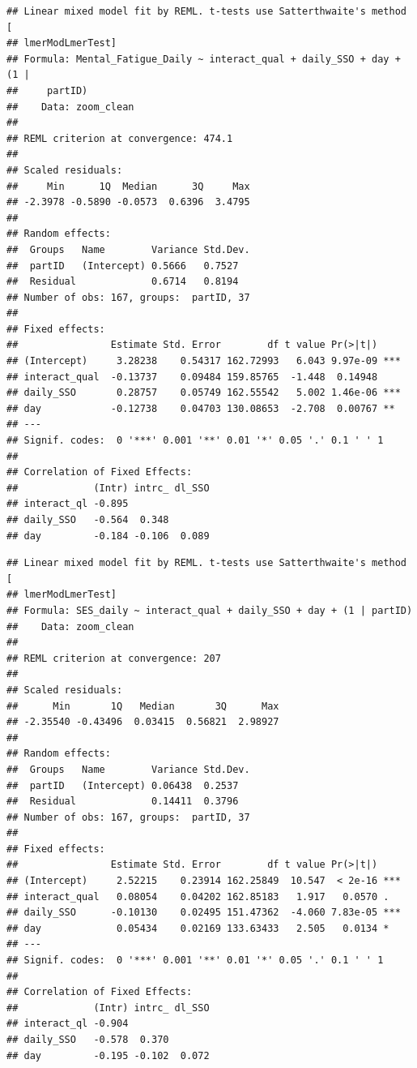 \documentclass[
  english,
  man]{apa7}
\begin{document}
\begin{verbatim}
## Linear mixed model fit by REML. t-tests use Satterthwaite's method [
## lmerModLmerTest]
## Formula: Mental_Fatigue_Daily ~ interact_qual + daily_SSO + day + (1 |  
##     partID)
##    Data: zoom_clean
## 
## REML criterion at convergence: 474.1
## 
## Scaled residuals: 
##     Min      1Q  Median      3Q     Max 
## -2.3978 -0.5890 -0.0573  0.6396  3.4795 
## 
## Random effects:
##  Groups   Name        Variance Std.Dev.
##  partID   (Intercept) 0.5666   0.7527  
##  Residual             0.6714   0.8194  
## Number of obs: 167, groups:  partID, 37
## 
## Fixed effects:
##                Estimate Std. Error        df t value Pr(>|t|)    
## (Intercept)     3.28238    0.54317 162.72993   6.043 9.97e-09 ***
## interact_qual  -0.13737    0.09484 159.85765  -1.448  0.14948    
## daily_SSO       0.28757    0.05749 162.55542   5.002 1.46e-06 ***
## day            -0.12738    0.04703 130.08653  -2.708  0.00767 ** 
## ---
## Signif. codes:  0 '***' 0.001 '**' 0.01 '*' 0.05 '.' 0.1 ' ' 1
## 
## Correlation of Fixed Effects:
##             (Intr) intrc_ dl_SSO
## interact_ql -0.895              
## daily_SSO   -0.564  0.348       
## day         -0.184 -0.106  0.089
\end{verbatim}

\begin{verbatim}
## Linear mixed model fit by REML. t-tests use Satterthwaite's method [
## lmerModLmerTest]
## Formula: SES_daily ~ interact_qual + daily_SSO + day + (1 | partID)
##    Data: zoom_clean
## 
## REML criterion at convergence: 207
## 
## Scaled residuals: 
##      Min       1Q   Median       3Q      Max 
## -2.35540 -0.43496  0.03415  0.56821  2.98927 
## 
## Random effects:
##  Groups   Name        Variance Std.Dev.
##  partID   (Intercept) 0.06438  0.2537  
##  Residual             0.14411  0.3796  
## Number of obs: 167, groups:  partID, 37
## 
## Fixed effects:
##                Estimate Std. Error        df t value Pr(>|t|)    
## (Intercept)     2.52215    0.23914 162.25849  10.547  < 2e-16 ***
## interact_qual   0.08054    0.04202 162.85183   1.917   0.0570 .  
## daily_SSO      -0.10130    0.02495 151.47362  -4.060 7.83e-05 ***
## day             0.05434    0.02169 133.63433   2.505   0.0134 *  
## ---
## Signif. codes:  0 '***' 0.001 '**' 0.01 '*' 0.05 '.' 0.1 ' ' 1
## 
## Correlation of Fixed Effects:
##             (Intr) intrc_ dl_SSO
## interact_ql -0.904              
## daily_SSO   -0.578  0.370       
## day         -0.195 -0.102  0.072
\end{verbatim}
\end{document}
